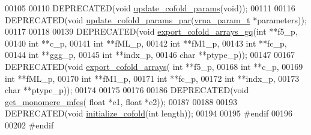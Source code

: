 \begin{DoxyCode}
00105 
00110 DEPRECATED(\textcolor{keywordtype}{void} \hyperlink{group__mfe__cofold_ga4fcbf34e77b99bfbb2333d2ab0c41a57}{update\_cofold\_params}(\textcolor{keywordtype}{void}));
00111 
00116 DEPRECATED(\textcolor{keywordtype}{void} \hyperlink{group__mfe__cofold_gaaadbd28b4e428710529ab4098fdacad3}{update\_cofold\_params\_par}(\hyperlink{group__energy__parameters_structvrna__param__s}{vrna\_param\_t} *parameters));
00117 
00118 
00139 DEPRECATED(\textcolor{keywordtype}{void} \hyperlink{group__mfe__cofold_ga5f5bf4df35d0554f6ace9579f8744c48}{export\_cofold\_arrays\_gq}(\textcolor{keywordtype}{int} **f5\_p,
00140                                         \textcolor{keywordtype}{int} **c\_p,
00141                                         \textcolor{keywordtype}{int} **fML\_p,
00142                                         \textcolor{keywordtype}{int} **fM1\_p,
00143                                         \textcolor{keywordtype}{int} **fc\_p,
00144                                         \textcolor{keywordtype}{int} **ggg\_p,
00145                                         \textcolor{keywordtype}{int} **indx\_p,
00146                                         \textcolor{keywordtype}{char} **ptype\_p));
00147 
00167 DEPRECATED(\textcolor{keywordtype}{void} \hyperlink{group__mfe__cofold_ga5cb6b59983f1f74ccc00b9b9c4e84482}{export\_cofold\_arrays}( \textcolor{keywordtype}{int} **f5\_p,
00168                                       \textcolor{keywordtype}{int} **c\_p,
00169                                       \textcolor{keywordtype}{int} **fML\_p,
00170                                       \textcolor{keywordtype}{int} **fM1\_p,
00171                                       \textcolor{keywordtype}{int} **fc\_p,
00172                                       \textcolor{keywordtype}{int} **indx\_p,
00173                                       \textcolor{keywordtype}{char} **ptype\_p));
00174 
00175 
00176 
00186 DEPRECATED(\textcolor{keywordtype}{void} \hyperlink{group__mfe__cofold_ga4958b517c613e4d2afd5bce6c1060a79}{get\_monomere\_mfes}( \textcolor{keywordtype}{float} *e1, \textcolor{keywordtype}{float} *e2));
00187 
00188 
00193 DEPRECATED(\textcolor{keywordtype}{void} \hyperlink{group__mfe__cofold_gafee0c32208aa2ac97338b6e3fbad7fa5}{initialize\_cofold}(\textcolor{keywordtype}{int} length));
00194 
00195 \textcolor{preprocessor}{#endif}
00196 
00202 \textcolor{preprocessor}{#endif}
\end{DoxyCode}
